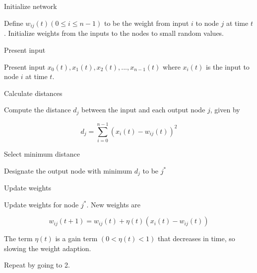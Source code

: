 \documentclass{article}
\begin{document}
    \subsection{}
\begin{enumerate}
\large{
\item Initialize network

Define $w_{ij}(t)(0\le i\le n-1)$ to be the weight from input $i$ to node $j$ at time $t$. Initialize weights from the inputs to the nodes to small random values. 

\item Present input

Present input $x_{0}(t),x_{1}(t),x_{2}(t),...,x_{n-1}(t)$ where $x_{i}(t)$ is the input to node $i$ at time $t$.

\item Calculate distances

Compute the distance $d_{j}$ between the input and each output node $j$, given by

$$d_{j}=\sum_{i=0}^{n-1}(x_{i}(t)-w_{ij}(t))^{2}$$

\item Select minimum distance

Designate the output node with minimum $d_{j}$ to be $j^*$

\item Update weights

Update weights for node $j^*$. New weights are

$$w_{ij}(t+1)=w_{ij}(t)+\eta(t)(x_{i}(t)-w_{ij}(t))$$

The term $\eta(t)$ is a gain term $(0<\eta(t)<1)$ that decreases in time, so slowing the weight adaption.

\item Repeat by going to 2. 
}
\end{enumerate}

    	 
    \vspace{0.5cm}
    

    \subsection{}
\end{document}
